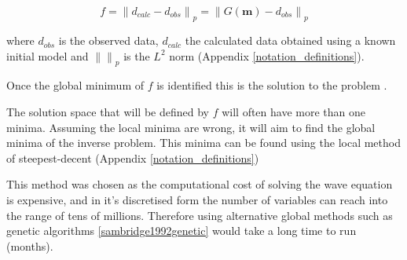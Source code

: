 \begin{equation}
f = \left \| d_{calc}-d_{obs} \right \|_{p} = \left \| G(\textbf{m})-d_{obs} \right \|_{p}
\label{objective_function}
\end{equation}

where $d_{obs}$ is the observed data, $d_{calc}$ the calculated data obtained using a known initial model and $\left \|  \right \|_{p}$ is the $L^{2}$ norm (Appendix \ref{notation_definitions}).
 
Once the global minimum of $f$ is identified this is the solution to the problem \citep{han2014seismic}.  

The solution space that will be defined by $f$ will often have more than one minima. Assuming the local minima are wrong, it will aim to find the global minima of the inverse problem. This minima can be found using the local method of steepest-decent (Appendix \ref{notation_definitions})

This method was chosen as the computational cost of solving the wave equation is expensive, and in it's discretised form the number of variables can reach into the range of tens of millions. Therefore using alternative global methods such as genetic algorithms \ref{sambridge1992genetic} would take a  long time to run (months).  


